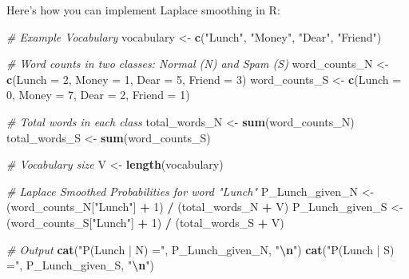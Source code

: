 \documentclass[
  12 pt,
  a4paper,
]{book}
\newenvironment{Shaded}{\begin{snugshade}}{\end{snugshade}}
\newcommand{\AttributeTok}[1]{\textcolor[rgb]{0.13,0.29,0.53}{#1}}
\newcommand{\CommentTok}[1]{\textcolor[rgb]{0.56,0.35,0.01}{\textit{#1}}}
\newcommand{\DecValTok}[1]{\textcolor[rgb]{0.00,0.00,0.81}{#1}}
\newcommand{\FunctionTok}[1]{\textcolor[rgb]{0.13,0.29,0.53}{\textbf{#1}}}
\newcommand{\NormalTok}[1]{#1}
\newcommand{\OtherTok}[1]{\textcolor[rgb]{0.56,0.35,0.01}{#1}}
\newcommand{\SpecialCharTok}[1]{\textcolor[rgb]{0.81,0.36,0.00}{\textbf{#1}}}
\newcommand{\StringTok}[1]{\textcolor[rgb]{0.31,0.60,0.02}{#1}}
\numberwithin{equation}{section}
\theoremstyle{plain}      %
\theoremstyle{definition} %
\theoremstyle{remark}     %
\theoremstyle{note}         %
\begin{document}
Here's how you can implement Laplace smoothing in R:

\scriptsize

\begin{Shaded}
\begin{Highlighting}[]
\CommentTok{\# Example Vocabulary}
\NormalTok{vocabulary }\OtherTok{\textless{}{-}} \FunctionTok{c}\NormalTok{(}\StringTok{"Lunch"}\NormalTok{, }\StringTok{"Money"}\NormalTok{, }\StringTok{"Dear"}\NormalTok{, }\StringTok{"Friend"}\NormalTok{)}

\CommentTok{\# Word counts in two classes: Normal (N) and Spam (S)}
\NormalTok{word\_counts\_N }\OtherTok{\textless{}{-}} \FunctionTok{c}\NormalTok{(}\AttributeTok{Lunch =} \DecValTok{2}\NormalTok{, }\AttributeTok{Money =} \DecValTok{1}\NormalTok{, }\AttributeTok{Dear =} \DecValTok{5}\NormalTok{, }\AttributeTok{Friend =} \DecValTok{3}\NormalTok{)}
\NormalTok{word\_counts\_S }\OtherTok{\textless{}{-}} \FunctionTok{c}\NormalTok{(}\AttributeTok{Lunch =} \DecValTok{0}\NormalTok{, }\AttributeTok{Money =} \DecValTok{7}\NormalTok{, }\AttributeTok{Dear =} \DecValTok{2}\NormalTok{, }\AttributeTok{Friend =} \DecValTok{1}\NormalTok{)}

\CommentTok{\# Total words in each class}
\NormalTok{total\_words\_N }\OtherTok{\textless{}{-}} \FunctionTok{sum}\NormalTok{(word\_counts\_N)}
\NormalTok{total\_words\_S }\OtherTok{\textless{}{-}} \FunctionTok{sum}\NormalTok{(word\_counts\_S)}

\CommentTok{\# Vocabulary size}
\NormalTok{V }\OtherTok{\textless{}{-}} \FunctionTok{length}\NormalTok{(vocabulary)}

\CommentTok{\# Laplace Smoothed Probabilities for word "Lunch"}
\NormalTok{P\_Lunch\_given\_N }\OtherTok{\textless{}{-}}\NormalTok{ (word\_counts\_N[}\StringTok{"Lunch"}\NormalTok{] }\SpecialCharTok{+} \DecValTok{1}\NormalTok{) }\SpecialCharTok{/}\NormalTok{ (total\_words\_N }\SpecialCharTok{+}\NormalTok{ V)}
\NormalTok{P\_Lunch\_given\_S }\OtherTok{\textless{}{-}}\NormalTok{ (word\_counts\_S[}\StringTok{"Lunch"}\NormalTok{] }\SpecialCharTok{+} \DecValTok{1}\NormalTok{) }\SpecialCharTok{/}\NormalTok{ (total\_words\_S }\SpecialCharTok{+}\NormalTok{ V)}

\CommentTok{\# Output}
\FunctionTok{cat}\NormalTok{(}\StringTok{"P(Lunch | N) ="}\NormalTok{, P\_Lunch\_given\_N, }\StringTok{"}\SpecialCharTok{\textbackslash{}n}\StringTok{"}\NormalTok{)}
\FunctionTok{cat}\NormalTok{(}\StringTok{"P(Lunch | S) ="}\NormalTok{, P\_Lunch\_given\_S, }\StringTok{"}\SpecialCharTok{\textbackslash{}n}\StringTok{"}\NormalTok{)}
\end{Highlighting}
\end{Shaded}
\end{document}
